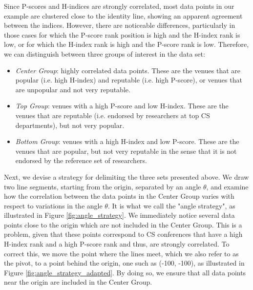 \documentclass[notitlepage]{svjour3}
\begin{document}
Since P-scores and H-indices are strongly correlated, most data points in our example are clustered close to the identity 
line, showing an apparent agreement between the indices. However, there are noticeable differences, 
particularly in those cases for which the P-score rank position is high and the H-index rank is low,
or for which the H-index rank is high and the 
P-score rank is low. Therefore, we 
can distinguish between three groups of interest in the data set:
%
\begin{itemize}
\item \textit{Center Group}: highly correlated data points. These are the 
venues that are popular (i.e. high H-index) and reputable (i.e. high P-score), 
or venues that are unpopular and not very reputable.
\item \textit{Top Group}: venues with a high P-score and low H-index. These 
are the venues that are reputable (i.e. endorsed by researchers at top CS departments), 
but not very popular.
\item \textit{Bottom Group}: venues with a high H-index and low P-score. 
These are the venues that are popular, but not very reputable in the sense 
that it is not endorsed by the reference set of researchers.
\end{itemize}
%
Next, we devise a strategy for delimiting the three sets
presented above. We draw two line segments, starting from
the origin, separated by an angle $ \theta $, and examine
how the correlation between the data points in the 
Center Group varies with respect to variations in the angle 
$ \theta $. It is what we call the "angle strategy", as 
illustrated in Figure \ref{fig:angle_strategy}. We immediately 
notice several data points close to the origin
which are not included in the Center Group. This is a problem, 
given that these points correspond to CS conferences that have a high H-index rank and a high
P-score rank and thus, are strongly correlated. To
correct this, we move the point where the lines meet, which we also
refer to as the pivot, to a point behind the origin, one
such as (-100, -100), as illustrated in Figure \ref{fig:angle_strategy_adapted}. 
By doing so, we ensure that all data points near the origin are included in the
Center Group.
\end{document}

